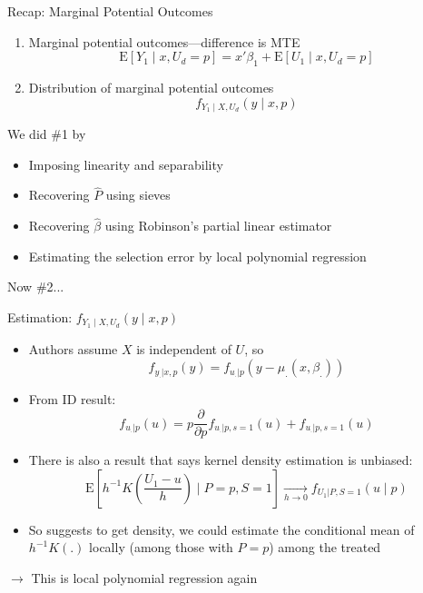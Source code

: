 \documentclass{beamer}
\begin{document}
\begin{frame}{Recap:  Marginal Potential Outcomes}
\begin{enumerate}
\item Marginal potential outcomes---difference is MTE
\begin{equation*}
  \mathrm{E}[Y_1\mid x,U_d=p] = x'\beta_1 +
  \mathrm{E}[U_1\mid x,U_d=p]
\end{equation*}
\item Distribution of marginal potential outcomes
  \begin{equation*}
    f_{Y_1\mid X,U_d}(y\mid x,p)
  \end{equation*}
\end{enumerate}

We did \#1 by
\begin{itemize}
\item Imposing linearity and separability
\item Recovering $\hat{P}$ using sieves
\item Recovering $\hat{\beta}$ using Robinson's partial linear
  estimator
\item Estimating the selection error by local polynomial regression
\end{itemize}
Now \#2...
  
\end{frame}

\begin{frame}{Estimation: $f_{Y_1\mid X,U_d}(y\mid x,p)$}
  \begin{itemize}
\item Authors assume $X$ is independent of $U$, so 
\begin{equation*}
  f_{y_.|x,p}(y) = f_{u_.|p}(y-\mu_.(x,\beta_.))
\end{equation*}

\item From ID result:
  \begin{equation*}
    f_{u_.|p}(u) = p \frac{\partial}{\partial
    p}f_{u_.|p,s=1}(u) + f_{u_.|p,s=1}(u)
  \end{equation*}
\item There is also a result that says kernel density estimation is
  unbiased:
  \begin{equation*}
    \mathrm{E}\left[h^{-1}K\left(\frac{U_1-u}{h}\right)\mid P=p,
      S=1\right]\xrightarrow[h \rightarrow 0]{} f_{U_1|P,S=1}(u\mid p)
  \end{equation*}
\item So suggests to get density, we could estimate the conditional mean of
  $h^{-1}K(.)$ locally (among those with $P=p$) among the treated 
  \end{itemize}
 $\rightarrow$ This is local polynomial regression again

  
\end{frame}
\end{document}

